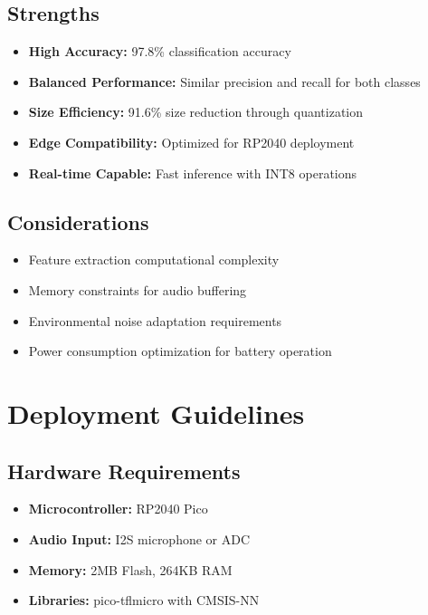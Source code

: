 \documentclass[12pt]{article}
\begin{document}
\subsection{Strengths}
\begin{itemize}
    \item \textbf{High Accuracy:} 97.8\% classification accuracy
    \item \textbf{Balanced Performance:} Similar precision and recall for both classes
    \item \textbf{Size Efficiency:} 91.6\% size reduction through quantization
    \item \textbf{Edge Compatibility:} Optimized for RP2040 deployment
    \item \textbf{Real-time Capable:} Fast inference with INT8 operations
\end{itemize}

\subsection{Considerations}
\begin{itemize}
    \item Feature extraction computational complexity
    \item Memory constraints for audio buffering
    \item Environmental noise adaptation requirements
    \item Power consumption optimization for battery operation
\end{itemize}

\section{Deployment Guidelines}

\subsection{Hardware Requirements}
\begin{itemize}
    \item \textbf{Microcontroller:} RP2040 Pico
    \item \textbf{Audio Input:} I2S microphone or ADC
    \item \textbf{Memory:} 2MB Flash, 264KB RAM
    \item \textbf{Libraries:} pico-tflmicro with CMSIS-NN
\end{itemize}
\end{document}
